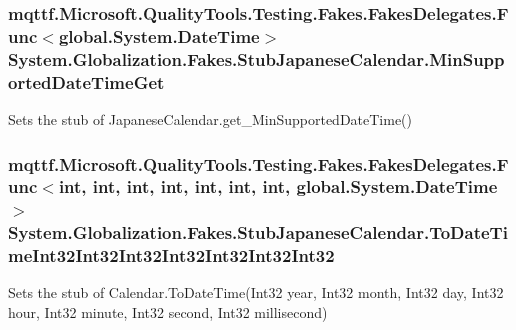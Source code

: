 \hypertarget{class_system_1_1_globalization_1_1_fakes_1_1_stub_japanese_calendar_ae04a999f8b59438efa836a256d4a4924}{
\subsubsection[{Min\-Supported\-Date\-Time\-Get}]{\setlength{\rightskip}{0pt plus 5cm}mqttf.\-Microsoft.\-Quality\-Tools.\-Testing.\-Fakes.\-Fakes\-Delegates.\-Func$<$global.\-System.\-Date\-Time$>$ System.\-Globalization.\-Fakes.\-Stub\-Japanese\-Calendar.\-Min\-Supported\-Date\-Time\-Get}}\label{class_system_1_1_globalization_1_1_fakes_1_1_stub_japanese_calendar_ae04a999f8b59438efa836a256d4a4924}


Sets the stub of Japanese\-Calendar.\-get\-\_\-\-Min\-Supported\-Date\-Time()

\hypertarget{class_system_1_1_globalization_1_1_fakes_1_1_stub_japanese_calendar_a2fc8f23bbbbeb998384cb694b86d903e}{
\subsubsection[{To\-Date\-Time\-Int32\-Int32\-Int32\-Int32\-Int32\-Int32\-Int32}]{\setlength{\rightskip}{0pt plus 5cm}mqttf.\-Microsoft.\-Quality\-Tools.\-Testing.\-Fakes.\-Fakes\-Delegates.\-Func$<$int, int, int, int, int, int, int, global.\-System.\-Date\-Time$>$ System.\-Globalization.\-Fakes.\-Stub\-Japanese\-Calendar.\-To\-Date\-Time\-Int32\-Int32\-Int32\-Int32\-Int32\-Int32\-Int32}}\label{class_system_1_1_globalization_1_1_fakes_1_1_stub_japanese_calendar_a2fc8f23bbbbeb998384cb694b86d903e}


Sets the stub of Calendar.\-To\-Date\-Time(\-Int32 year, Int32 month, Int32 day, Int32 hour, Int32 minute, Int32 second, Int32 millisecond)


